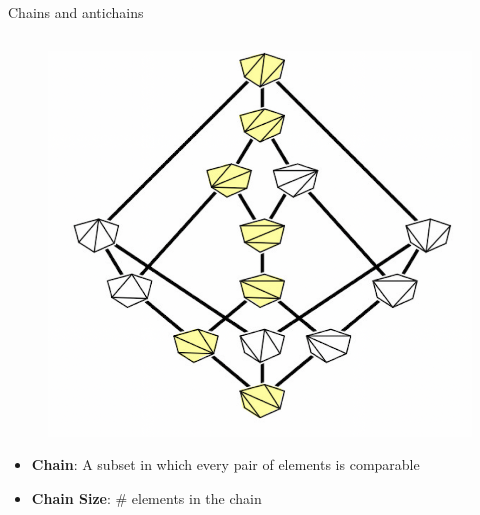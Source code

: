 \documentclass[xcolor=x11names,compress,t]{beamer}
\begin{document}
\begin{frame}{Chains and antichains}
   \vspace{-1cm}
    \begin{columns}
    
        \begin{column}{0.5\textwidth}
            \begin{figure}
                \centering
                \includegraphics[scale = 0.3]{ExA.png}
            \end{figure}
            \begin{itemize}
                \item \textbf{Chain}: A subset in which every pair of elements is comparable
                
                \item \textbf{Chain Size}: \# elements in the chain
            \end{itemize}
        \end{column}
        
        
        

\end{columns}
\end{frame}
\end{document}
